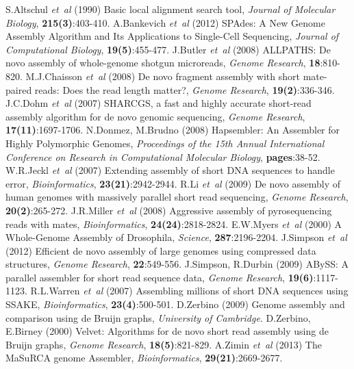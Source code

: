 \documentclass[12pt]{article}
\begin{document}
%

%
%
\begin{thebibliography}{}
 S.Altschul {\it et~al} (1990) Basic local alignment search tool, \textit{Journal of Molecular Biology}, {\bf 215(3)}:403-410.
 A.Bankevich {\it et~al} (2012) SPAdes: A New Genome Assembly Algorithm and Its Applications to Single-Cell Sequencing, \textit{Journal of Computational Biology}, {\bf 19(5)}:455-477.
 J.Butler \textit{et~al} (2008) ALLPATHS: De novo assembly of whole-genome shotgun microreads, {\it Genome Research}, {\bf 18}:810-820.
 M.J.Chaisson \textit{et~al} (2008) De novo fragment assembly with short mate-paired reads: Does the read length matter?, \textit{Genome Research}, {\bf 19(2)}:336-346.
 J.C.Dohm \textit{et~al} (2007) SHARCGS, a fast and highly accurate short-read assembly algorithm for de novo genomic sequencing, \textit{Genome Research}, {\bf 17(11)}:1697-1706.
 N.Donmez, M.Brudno (2008) Hapsembler: An Assembler for Highly Polymorphic Genomes, \textit{Proceedings of the 15th Annual International Conference on Research in Computational Molecular Biology}, {\bf pages}:38-52.
 W.R.Jeckl \textit{et~al} (2007) Extending assembly of short DNA sequences to handle error, \textit{Bioinformatics}, {\bf 23(21)}:2942-2944.
 R.Li \textit{et~al} (2009) De novo assembly of human genomes with massively parallel short read sequencing, \textit{Genome Research}, {\bf 20(2)}:265-272.
 J.R.Miller \textit{et~al} (2008) Aggressive assembly of pyrosequencing reads with mates, \textit{Bioinformatics}, {\bf 24(24)}:2818-2824.
 E.W.Myers \textit{et~al} (2000) A Whole-Genome Assembly of Drosophila, \textit{Science}, {\bf 287}:2196-2204.
 J.Simpson \textit{et~al} (2012) Efficient de novo assembly of large genomes using compressed data structures, \textit{Genome Research}, {\bf 22}:549-556.
 J.Simpson, R.Durbin (2009) ABySS: A parallel assembler for short read sequence data, \textit{Genome Research}, {\bf 19(6)}:1117-1123.
 R.L.Warren \textit{et~al} (2007) Assembling millions of short DNA sequences using SSAKE, \textit{Bioinformatics}, {\bf 23(4)}:500-501.
 D.Zerbino (2009) Genome assembly and comparison using de Bruijn graphs, \textit{University of Cambridge}.
 D.Zerbino, E.Birney (2000) Velvet: Algorithms for de novo short read assembly using de Bruijn graphs, \textit{Genome Research}, {\bf 18(5)}:821-829.
 A.Zimin \textit{et~al} (2013) The MaSuRCA genome Assembler, \textit{Bioinformatics}, {\bf 29(21)}:2669-2677.

\end{thebibliography}
\end{document}
